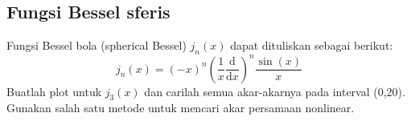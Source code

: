\subsection{Fungsi Bessel sferis}
Fungsi Bessel bola (spherical Bessel) $j_{n}(x)$ dapat dituliskan sebagai
berikut:
\begin{equation*}
j_{n}(x) = (-x)^{n}
\left( \frac{1}{x} \frac{\mathrm{d}}{\mathrm{d}x} \right)^n
\frac{\sin(x)}{x}
\end{equation*}
Buatlah plot untuk $j_{3}(x)$ dan carilah semua akar-akarnya pada interval (0,20).
Gunakan salah satu metode untuk mencari akar persamaan nonlinear.